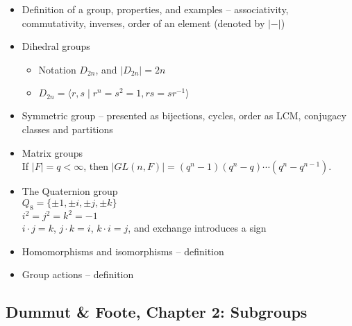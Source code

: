 \begin{itemize}
\item Definition of a group, properties, and examples -- associativity, commutativity, inverses, order of an element (denoted by $|-|$)
\item Dihedral groups
  \begin{itemize}
  \item Notation $D_{2n}$, and $|D_{2n}| = 2n$
  \item $D_{2n} = \langle r,s \;|\; r^n = s^2 = 1, r s = s r^{-1} \rangle$
  \end{itemize}
\item Symmetric group -- presented as bijections, cycles, order as LCM, conjugacy classes and partitions
\item Matrix groups \\
  If $|F| = q < \infty$, then $|GL(n, F)| = (q^n-1)(q^n-q)\cdots(q^n-q^{n-1})$.
\item The Quaternion group \\
  $Q_8 = \{\pm 1, \pm i, \pm j, \pm k\}$ \\
  $i^2 = j^2 = k^2 = -1$ \\
  $i \cdot j = k$, $j \cdot k = i$, $k \cdot i = j$, and exchange introduces a sign
\item Homomorphisms and isomorphisms -- definition
\item Group actions -- definition
\end{itemize}

\subsection{Dummut \& Foote, Chapter 2: Subgroups}

